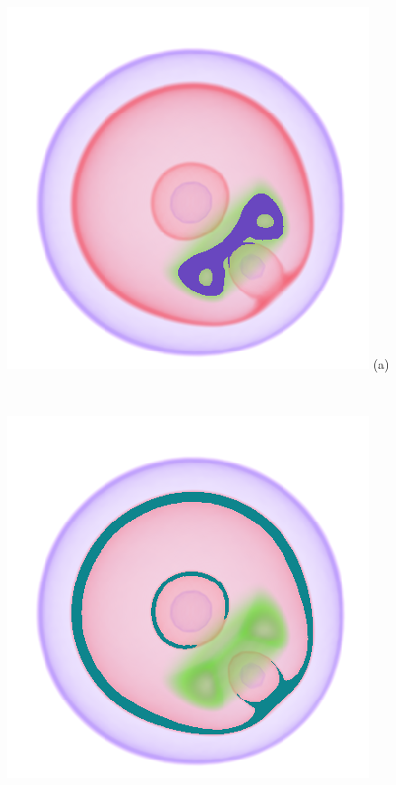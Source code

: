 \documentclass[twoside,twocolumn,10pt]{article}
\begin{document}
\begin{figure}
	\centering
	\begin{minipage}{.16\textwidth}
		\centering
		\includegraphics[width=1\linewidth]{crop/nucleon_segment_green}
(a)
	\end{minipage}~
	\begin{minipage}{.16\textwidth}
		\centering
		\includegraphics[width=1\linewidth]{crop/nucleon_segment_red}

\end{minipage}
\end{figure}
\end{document}
